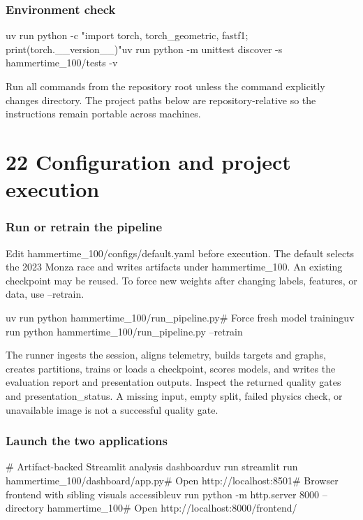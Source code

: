 \documentclass[11pt,a4paper,oneside]{report}
\begin{document}
\subsection*{Environment check}

uv run python -c "import torch, torch\_geometric, fastf1; print(torch.\_\_version\_\_)"uv run python -m unittest discover -s hammertime\_100/tests -v

Run all commands from the repository root unless the command explicitly changes directory. The project paths below are repository-relative so the instructions remain portable across machines.

\clearpage

\clearpage\chapter*{22 Configuration and project execution}

\subsection*{Run or retrain the pipeline}

Edit hammertime\_100/configs/default.yaml before execution. The default selects the 2023 Monza race and writes artifacts under hammertime\_100. An existing checkpoint may be reused. To force new weights after changing labels, features, or data, use --retrain.

uv run python hammertime\_100/run\_pipeline.py\# Force fresh model traininguv run python hammertime\_100/run\_pipeline.py --retrain

The runner ingests the session, aligns telemetry, builds targets and graphs, creates partitions, trains or loads a checkpoint, scores models, and writes the evaluation report and presentation outputs. Inspect the returned quality gates and presentation\_status. A missing input, empty split, failed physics check, or unavailable image is not a successful quality gate.

\subsection*{Launch the two applications}

\# Artifact-backed Streamlit analysis dashboarduv run streamlit run hammertime\_100/dashboard/app.py\# Open http://localhost:8501\# Browser frontend with sibling visuals accessibleuv run python -m http.server 8000 --directory hammertime\_100\# Open http://localhost:8000/frontend/
\end{document}
